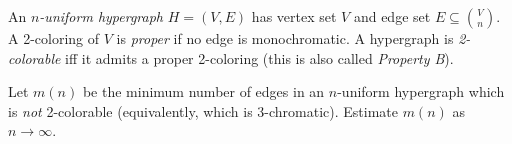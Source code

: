An \emph{$n$-uniform hypergraph} $H=(V,E)$ has vertex set $V$ and edge set
$E\subseteq\binom{V}{n}$.
A 2-coloring of $V$ is \emph{proper} if no edge is monochromatic.
A hypergraph is \emph{2-colorable} iff it admits a proper 2-coloring (this is
also called \emph{Property B}).

Let $m(n)$ be the minimum number of edges in an $n$-uniform hypergraph which is
\emph{not} 2-colorable (equivalently, which is 3-chromatic).
Estimate $m(n)$ as $n\to\infty$.
